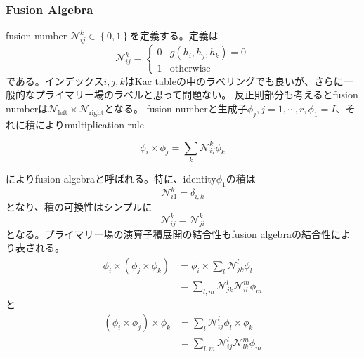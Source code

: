 \documentclass[11pt, aps, longbibliography]{article}
\numberwithin{equation}{section}
\begin{document}
        \subsubsection{Fusion Algebra}
        fusion number $\mathcal{N}_{ij}^k \in \left\{ 0, 1\right\}$を定義する。定義は
        \begin{equation}\label{eq:fusion2-1}
            \mathcal{N}_{ij}^k = \left\{ \begin{array}{ll}
                0 & g(h_i,h_j,h_k)=0 \\ 1 & \text{otherwise}
            \end{array} \right.
        \end{equation}
        である。インデックス$i,j,k$はKac tableの中のラベリングでも良いが、さらに一般的なプライマリー場のラベルと思って問題ない。
        反正則部分も考えるとfusion numberは$\mathcal{N}_{\text{left}}\times \mathcal{N}_{\text{right}}$となる。
        fusion numberと生成子$\phi_j, j=1,\cdots,r, \phi_1 = I$、それに積によりmultiplication rule
        \begin{tcolorbox}
            \begin{equation}\label{eq:fusion2-2}
                \phi_i \times \phi_j = \sum_k \mathcal{N}_{ij}^k \phi_k
            \end{equation}
        \end{tcolorbox}
        によりfusion algebraと呼ばれる。特に、identity$\phi_1$の積は
        \begin{equation}\label{eq:fusion2-3}
            \mathcal{N}_{i1}^k = \delta_{i,k}
        \end{equation}
        となり、積の可換性はシンプルに
        \begin{equation}\label{eq:fusion2-4}
            \mathcal{N}_{ij}^k = \mathcal{N}_{ji}^k
        \end{equation}
        となる。プライマリー場の演算子積展開の結合性もfusion algebraの結合性により表される。
        \begin{align}\label{eq:fusion2-5}
            \phi_i \times (\phi_j \times \phi_k) &= \phi_i \times \sum_{l}\mathcal{N}_{jk}^l \phi_l \\
            &= \sum_{l,m}\mathcal{N}_{jk}^l \mathcal{N}_{il}^m \phi_m
        \end{align}
        と
        \begin{align}\label{eq:fusion2-6}
            (\phi_i \times \phi_j) \times \phi_k &= \sum_l \mathcal{N}_{ij}^l \phi_l \times \phi_k \\
            &= \sum_{l,m}\mathcal{N}_{ij}^l \mathcal{N}_{lk}^m \phi_m
        \end{align}
\end{document}
